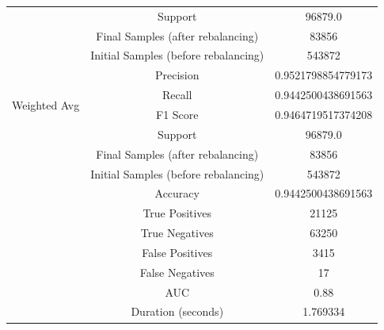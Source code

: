\begin{longtable}{|c|c|c|}
 & Support & 96879.0 \\
 & Final Samples (after rebalancing) & 83856 \\
 & Initial Samples (before rebalancing) & 543872 \\
\hline
\multirow{4}{*}{Weighted Avg} & Precision & 0.9521798854779173 \\
 & Recall & 0.9442500438691563 \\
 & F1 Score & 0.9464719517374208 \\
 & Support & 96879.0 \\
 & Final Samples (after rebalancing) & 83856 \\
 & Initial Samples (before rebalancing) & 543872 \\
\hline
& Accuracy & 0.9442500438691563 \\ \hline
& True Positives & 21125 \\ \hline
& True Negatives & 63250 \\ \hline
& False Positives & 3415 \\ \hline
& False Negatives & 17 \\ \hline
& AUC & 0.88 \\ \hline
& Duration (seconds) & 1.769334 \\ \hline
\end{longtable}


